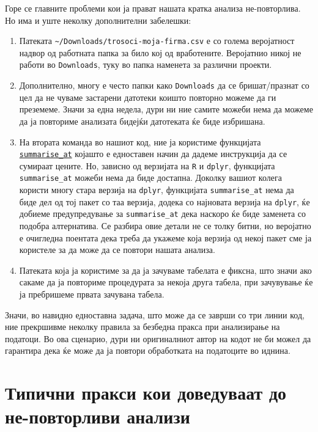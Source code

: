 \documentclass[
]{book}
\begin{document}
Горе се главните проблеми кои ја прават нашата кратка анализа не-повторлива. Но има и уште неколку дополнителни забелешки:

\begin{enumerate}
\def\labelenumi{\arabic{enumi}.}
\setcounter{enumi}{3}
\item
  Патеката \texttt{\textasciitilde{}/Downloads/trosoci-moja-firma.csv} е со голема веројатност надвор од работната папка за било кој од вработените. Веројатнио никој не работи во \texttt{Downloads}, туку во папка наменета за различни проекти.
\item
  Дополнително, многу е често папки како \texttt{Downloads} да се бришат/празнат со цел да не чуваме застарени датотеки коишто повторно можеме да ги преземеме. Значи за една недела, дури ни ние самите можеби нема да можеме да ја повториме анализата бидејќи датотеката ќе биде избришана.
\item
  На втората команда во нашиот код, ние ја користиме функцијата \href{https://www.rdocumentation.org/packages/dplyr/versions/0.7.8/topics/summarise_all}{\texttt{summarise\_at}} којашто е едноставен начин да дадеме инструкција да се сумираат цените. Но, зависно од верзијата на \texttt{R} и \texttt{dplyr}, функцијата \texttt{summarise\_at} можеби нема да биде достапна. Доколку вашиот колега користи многу стара верзија на \texttt{dplyr}, функцијата \texttt{summarise\_at} нема да биде дел од тој пакет со таа верзија, додека со најновата верзија на \texttt{dplyr}, ќе добиеме предупредување за \texttt{summarise\_at} дека наскоро ќе биде заменета со подобра алтернатива. Се разбира овие детали не се толку битни, но веројатно е очигледна поентата дека треба да укажеме која верзија од некој пакет сме ја користеле за да може да се повтори нашата анализа.
\item
  Патеката која ја користиме за да ја зачуваме табелата е фиксна, што значи ако сакаме да ја повториме процедурата за некоја друга табела, при зачувување ќе ја пребришеме првата зачувана табела.
\end{enumerate}

Значи, во навидно едноставна задача, што може да се заврши со три линии код, ние прекршивме неколку правила за безбедна пракса при анализирање на податоци. Во ова сценарио, дури ни оригиналниот автор на кодот не би можел да гарантира дека ќе може да ја повтори обработката на податоците во иднина.

\hypertarget{indicators}{%
\section{Типични пракси кои доведуваат до не-повторливи анализи}\label{indicators}}
\end{document}
